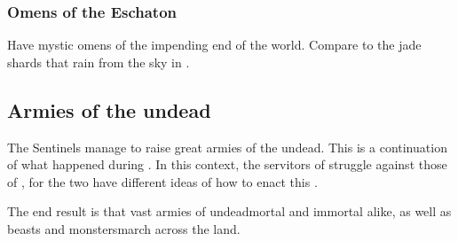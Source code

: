 




\subsubsection{Omens of the Eschaton}
Have mystic omens of the impending end of the world. 
Compare to the jade shards that rain from the sky in \cite{StevenErikson:DustofDreams}. 









\subsection{Armies of the undead}
The Sentinels manage to raise great armies of the undead. 
This is a continuation of what happened during . 
In this context, the servitors of \Thessulax struggle against those of \Secherdamon, for the two have different ideas of how to enact this . 

The end result is that vast armies of undead\dash mortal and immortal alike, as well as beasts and monsters\dash march across the land.









